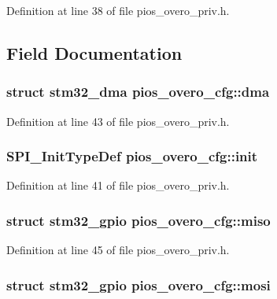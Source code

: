 \-Definition at line 38 of file pios\-\_\-overo\-\_\-priv.\-h.



\subsection{\-Field \-Documentation}
\hypertarget{structpios__overo__cfg_a16a7dbb7388c47c8b5479da68176de6c}{
\subsubsection[{dma}]{\setlength{\rightskip}{0pt plus 5cm}struct {\bf stm32\-\_\-dma} {\bf pios\-\_\-overo\-\_\-cfg\-::dma}}}\label{structpios__overo__cfg_a16a7dbb7388c47c8b5479da68176de6c}


\-Definition at line 43 of file pios\-\_\-overo\-\_\-priv.\-h.

\hypertarget{structpios__overo__cfg_a7eab710432a7a408f6bc9312e5d12e24}{
\subsubsection[{init}]{\setlength{\rightskip}{0pt plus 5cm}\-S\-P\-I\-\_\-\-Init\-Type\-Def {\bf pios\-\_\-overo\-\_\-cfg\-::init}}}\label{structpios__overo__cfg_a7eab710432a7a408f6bc9312e5d12e24}


\-Definition at line 41 of file pios\-\_\-overo\-\_\-priv.\-h.

\hypertarget{structpios__overo__cfg_a4f182bb3911f41c5e505ed81e688c343}{
\subsubsection[{miso}]{\setlength{\rightskip}{0pt plus 5cm}struct {\bf stm32\-\_\-gpio} {\bf pios\-\_\-overo\-\_\-cfg\-::miso}}}\label{structpios__overo__cfg_a4f182bb3911f41c5e505ed81e688c343}


\-Definition at line 45 of file pios\-\_\-overo\-\_\-priv.\-h.

\hypertarget{structpios__overo__cfg_a5aea93e3a5fcc6249bad26a9ffcccc8a}{
\subsubsection[{mosi}]{\setlength{\rightskip}{0pt plus 5cm}struct {\bf stm32\-\_\-gpio} {\bf pios\-\_\-overo\-\_\-cfg\-::mosi}}}\label{structpios__overo__cfg_a5aea93e3a5fcc6249bad26a9ffcccc8a}


